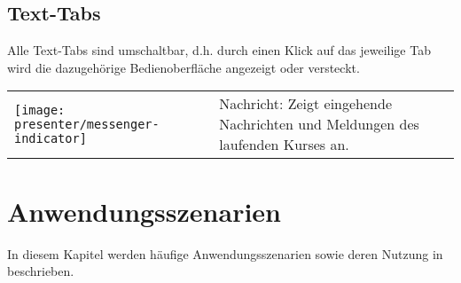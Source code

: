 \subsection{Text-Tabs}
Alle Text-Tabs sind umschaltbar, d.h. durch einen Klick auf das jeweilige Tab wird die dazugehörige Bedienoberfläche angezeigt oder versteckt.

\begin{longtable}{p{1cm}p{12cm}}
	\begin{minipage}{.05\textwidth}
		\texttt{[image: presenter/messenger-indicator]}
	\end{minipage}
	& Nachricht: Zeigt eingehende Nachrichten und Meldungen des laufenden Kurses an.
\end{longtable}

\section{Anwendungsszenarien}
\label{section:presenter-use-cases}
In diesem Kapitel werden häufige Anwendungsszenarien sowie deren Nutzung in \lectPresenter{} beschrieben.


